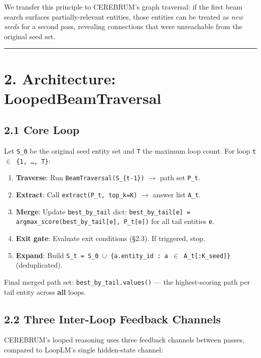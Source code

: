 We transfer this principle to CEREBRUM's graph traversal: if the first beam search surfaces partially-relevant entities, those entities can be treated as \textit{new seeds} for a second pass, revealing connections that were unreachable from the original seed set.

\medskip\noindent\rule{\linewidth}{0.4pt}\medskip

\section*{2. Architecture: LoopedBeamTraversal}

\subsection*{2.1 Core Loop}

Let \texttt{S\_0} be the original seed entity set and \texttt{T} the maximum loop count. For loop \texttt{t $\in$ \{1, …, T\}}:

\begin{enumerate}
  \item \textbf{Traverse}: Run \texttt{BeamTraversal(S\_\{t-1\})} $\to$ path set \texttt{P\_t}.
  \item \textbf{Extract}: Call \texttt{extract(P\_t, top\_k=K)} $\to$ answer list \texttt{A\_t}.
  \item \textbf{Merge}: Update \texttt{best\_by\_tail} dict: \texttt{best\_by\_tail[e] = argmax\_score(best\_by\_tail[e], P\_t[e])} for all tail entities \texttt{e}.
  \item \textbf{Exit gate}: Evaluate exit conditions (§2.3). If triggered, stop.
  \item \textbf{Expand}: Build \texttt{S\_t = S\_0 $\cup$ \{a.entity\_id : a $\in$ A\_t[:K\_seed]\}} (deduplicated).
\end{enumerate}


Final merged path set: \texttt{best\_by\_tail.values()} --- the highest-scoring path per tail entity across \textbf{all} loops.

\subsection*{2.2 Three Inter-Loop Feedback Channels}

CEREBRUM's looped reasoning uses three feedback channels between passes, compared to LoopLM's single hidden-state channel:

